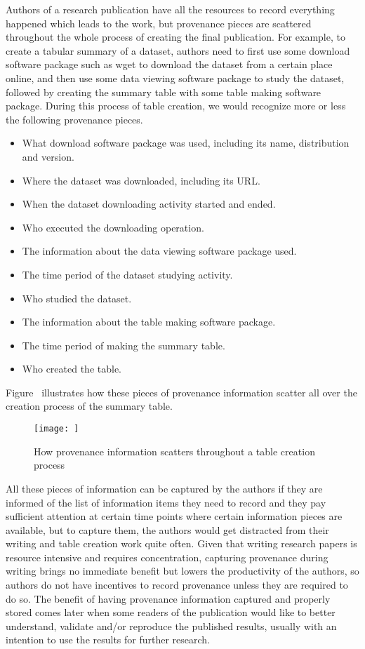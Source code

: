 Authors of a research publication have all the resources to record everything happened which leads to the work, but provenance pieces are scattered throughout the whole process of creating the final publication. For example, to create a tabular summary of a dataset, authors need to first use some download software package such as wget to download the dataset from a certain place online, and then use some data viewing software package to study the dataset, followed by creating the summary table with some table making software package. During this process of table creation, we would recognize more or less the following provenance pieces.
\begin{itemize}
\item What download software package was used, including its name, distribution and version.
\item Where the dataset was downloaded, including its URL.
\item When the dataset downloading activity started and ended.
\item Who executed the downloading operation.
\item The information about the data viewing software package used.
\item The time period of the dataset studying activity.
\item Who studied the dataset.
\item The information about the table making software package.
\item The time period of making the summary table.
\item Who created the table.
\end{itemize}
Figure~\cite{prov-pieces} illustrates how these pieces of provenance information scatter all over the creation process of the summary table.
\begin{figure}
\centering
\texttt{[image: ]}
\caption{How provenance information scatters throughout a table creation process}
\end{figure}
All these pieces of information can be captured by the authors if they are informed of the list of information items they need to record and they pay sufficient attention at certain time points where certain information pieces are available, but to capture them, the authors would get distracted from their writing and table creation work quite often. Given that writing research papers is resource intensive and requires concentration, capturing provenance during writing brings no immediate benefit but lowers the productivity of the authors, so authors do not have incentives to record provenance unless they are required to do so. The benefit of having provenance information captured and properly stored comes later when some readers of the publication would like to better understand, validate and/or reproduce the published results, usually with an intention to use the results for further research.


